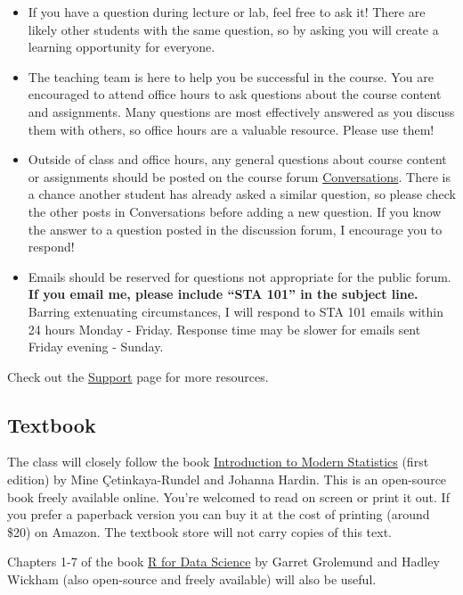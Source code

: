 \documentclass[
  letterpaper,
  DIV=11,
  numbers=noendperiod]{scrartcl}
\providecommand{\tightlist}{%
  \setlength{\itemsep}{0pt}\setlength{\parskip}{0pt}}
\begin{document}
\begin{itemize}
\tightlist
\item
  If you have a question during lecture or lab, feel free to ask it!
  There are likely other students with the same question, so by asking
  you will create a learning opportunity for everyone.
\item
  The teaching team is here to help you be successful in the course. You
  are encouraged to attend office hours to ask questions about the
  course content and assignments. Many questions are most effectively
  answered as you discuss them with others, so office hours are a
  valuable resource. Please use them!
\item
  Outside of class and office hours, any general questions about course
  content or assignments should be posted on the course forum
  \href{https://sakai.duke.edu/portal/site/37c2d38d-400d-4210-8e42-83e19f9099b3/tool/bab0d8c9-88e8-4138-9490-2c2ad1a33858}{Conversations}.
  There is a chance another student has already asked a similar
  question, so please check the other posts in Conversations before
  adding a new question. If you know the answer to a question posted in
  the discussion forum, I encourage you to respond!
\item
  Emails should be reserved for questions not appropriate for the public
  forum. \textbf{If you email me, please include ``STA 101'' in the
  subject line.} Barring extenuating circumstances, I will respond to
  STA 101 emails within 24 hours Monday - Friday. Response time may be
  slower for emails sent Friday evening - Sunday.
\end{itemize}

Check out the \href{/course-support.html}{Support} page for more
resources.

\hypertarget{textbook}{%
\subsection{Textbook}\label{textbook}}

The class will closely follow the book
\href{https://openintro-ims.netlify.app/}{Introduction to Modern
Statistics} (first edition) by Mine Çetinkaya-Rundel and Johanna Hardin.
This is an open-source book freely available online. You're welcomed to
read on screen or print it out. If you prefer a paperback version you
can buy it at the cost of printing (around \$20) on Amazon. The textbook
store will not carry copies of this text.

Chapters 1-7 of the book \href{https://r4ds.had.co.nz/}{R for Data
Science} by Garret Grolemund and Hadley Wickham (also open-source and
freely available) will also be useful.
\end{document}
